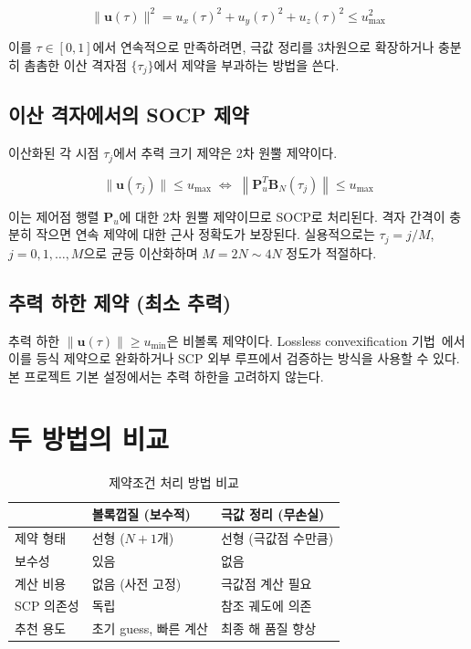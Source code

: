 \documentclass[11pt]{article}
\begin{document}
\begin{equation}
  \|\mathbf{u}(\tau)\|^2 = u_x(\tau)^2 + u_y(\tau)^2 + u_z(\tau)^2 \leq u_{\max}^2
  \label{eq:thrust_norm}
\end{equation}

이를 $\tau \in [0,1]$에서 연속적으로 만족하려면, 극값 정리를 3차원으로 확장하거나
충분히 촘촘한 이산 격자점 $\{\tau_j\}$에서 제약을 부과하는 방법을 쓴다.

\subsection{이산 격자에서의 SOCP 제약}

이산화된 각 시점 $\tau_j$에서 추력 크기 제약은 2차 원뿔 제약이다.

\begin{equation}
  \|\mathbf{u}(\tau_j)\| \leq u_{\max}
  \;\Longleftrightarrow\;
  \left\|\mathbf{P}_u^T \mathbf{B}_N(\tau_j)\right\| \leq u_{\max}
  \label{eq:socp_constraint}
\end{equation}

이는 제어점 행렬 $\mathbf{P}_u$에 대한 2차 원뿔 제약이므로 SOCP로 처리된다.
격자 간격이 충분히 작으면 연속 제약에 대한 근사 정확도가 보장된다.
실용적으로는 $\tau_j = j/M$, $j = 0, 1, \ldots, M$으로 균등 이산화하며
$M = 2N \sim 4N$ 정도가 적절하다.

\subsection{추력 하한 제약 (최소 추력)}

추력 하한 $\|\mathbf{u}(\tau)\| \geq u_{\min}$은 비볼록 제약이다.
Lossless convexification 기법~\cite{report007}에서 이를 등식 제약으로 완화하거나
SCP 외부 루프에서 검증하는 방식을 사용할 수 있다.
본 프로젝트 기본 설정에서는 추력 하한을 고려하지 않는다.

\section{두 방법의 비교}

\begin{table}[h]
  \centering
  \caption{제약조건 처리 방법 비교}
  \label{tab:constraint_comparison}
  \begin{tabular}{p{3.0cm}p{4.5cm}p{4.5cm}}
    \toprule
    & 볼록껍질 (보수적) & 극값 정리 (무손실) \\
    \midrule
    제약 형태    & 선형 ($N+1$개) & 선형 (극값점 수만큼) \\
    보수성       & 있음 & 없음 \\
    계산 비용    & 없음 (사전 고정) & 극값점 계산 필요 \\
    SCP 의존성   & 독립 & 참조 궤도에 의존 \\
    추천 용도    & 초기 guess, 빠른 계산 & 최종 해 품질 향상 \\
    \bottomrule
  \end{tabular}
\end{table}
\end{document}
